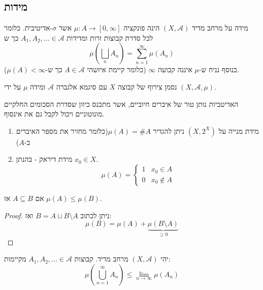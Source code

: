 \documentclass{tstextbook}
\begin{document}
\subsection{מידות}

\begin{definition}[מידה]
מידה על מרחב מדיד \(\left( X,\mathcal{A} \right)\) הינה פונקציה \(\mu:A\to \left[ 0,\infty \right]\) אשר \(\sigma\)-אדיטיבית. כלומר לכל סדרת קבוצות זרות ומדידות \(A_{1},A_{2},\dots \in \mathcal{A}\) כך ש
$$\mu\left( \bigsqcup_{n} A_{n} \right)=\sum_{n=1}^{\infty}\mu(A_{n})$$
בנוסף נניח ש-\(\mu\) איננה קבועה \(\infty\) (כלומר קיימת איזשהי \(A \in \mathcal{ A}\) כך ש-\(\mu(A)< \infty\)).

\end{definition}
\begin{symbolize}
נסמן צירוף של קבוצה \(X\) עם סיגמא אלגברה \(\mathcal{A}\) ומידה \(\mu\) על ידי \(\left( X,\mathcal{A},\mu \right)\).

\end{symbolize}
\begin{remark}
האדיטביות נותן טור של איברים חיוביים, אשר מתכנס כיוון שסדרת הסכומים החלקיים מונוטוניים ויכול לקבל גם את אינסוף.

\end{remark}
\begin{example}
  \begin{enumerate}
    \item מידת מנייה על \((X,2^{X})\) ניתן להגדיר \(\mu(A)=\# A\)(כלומר מחזיר את מספר האיברים ב-\(A\)) 


    \item מידת דיראק - בהנתן \(x_{0} \in X\). 
$$\mu (A)= \begin{cases} 1  & x_{0} \in A \\0  & x_{0} \not \in A
\end{cases}$$


  \end{enumerate}
\end{example}
\begin{proposition}[מונוטוניות]
אם \(A\subseteq B\) אז \(\mu(A)\leq \mu(B)\). 

\end{proposition}
\begin{proof}
ניתן לכתוב \(B=A\sqcup B\setminus  A\) ואז:
$$\mu(B)=\mu(A)+\underbrace{ \mu\left( B\setminus A \right) }_{ \geq 0 }$$

\end{proof}
\begin{proposition}[תת-אדטיביות]
יהי \(\left( X,\mathcal{A} \right)\) מרחב מדיד. קבוצות \(A_{1},A_{2},\dots \in \mathcal{A}\)  מקיימות:
$$\mu\left( \bigcup_{n=1}^{\infty}A_{n} \right)\leq \lim_{ n \to \infty } \mu(A_{n})$$

\end{proposition}
\end{document}
